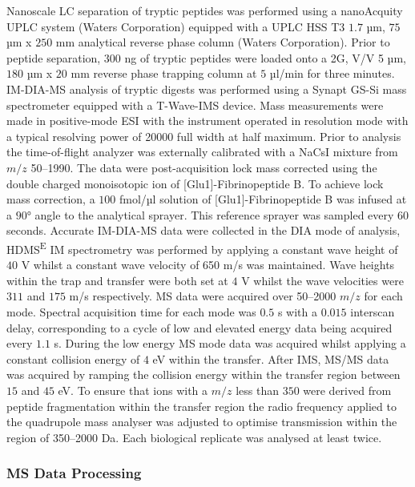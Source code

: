 Nanoscale LC separation of tryptic peptides was performed using a nanoAcquity UPLC system (Waters Corporation) equipped with a UPLC HSS T3 $1.7$ µm, $75$ µm x $250$ mm analytical reverse phase column (Waters Corporation).
Prior to peptide separation, $300$ ng of tryptic peptides were loaded onto a 2G, V/V 5 µm, $180$ µm x $20$ mm reverse phase trapping column at $5$ µl/min for three minutes.
IM-DIA-MS analysis of tryptic digests was performed using a Synapt GS-Si mass spectrometer equipped with a T-Wave-IMS device.
Mass measurements were made in positive-mode ESI with the instrument operated in resolution mode with a typical resolving power of \num{20000} full width at half maximum.
Prior to analysis the time-of-flight analyzer was externally calibrated with a NaCsI mixture from $m/z$ \numrange{50}{1990}. The data were post-acquisition lock mass corrected using the double charged monoisotopic ion of [Glu1]-Fibrinopeptide B.
To achieve lock mass correction, a $100$ fmol/µl solution of [Glu1]-Fibrinopeptide B was infused at a $90$° angle to the analytical sprayer. This reference sprayer was sampled every $60$ seconds.
Accurate IM-DIA-MS data were collected in the DIA mode of analysis, HDMS\textsuperscript{E} IM spectrometry was performed by applying a constant wave height of $40$ V whilst a constant wave velocity of 650 m/s was maintained.
Wave heights within the trap and transfer were both set at $4$ V whilst the wave velocities were $311$ and $175$ m/s respectively.
MS data were acquired over \numrange{50}{2000} $m/z$ for each mode.
Spectral acquisition time for each mode was $0.5$ s with a $0.015$ interscan delay, corresponding to a cycle of low and elevated energy data being acquired every $1.1$ s.
During the low energy MS mode data was acquired whilst applying a constant collision energy of $4$ eV within the transfer.
After IMS, MS/MS data was acquired by ramping the collision energy within the transfer region between $15$ and $45$ eV.
To ensure that ions with a $m/z$ less than $350$ were derived from peptide fragmentation within the transfer region the radio frequency applied to the quadrupole mass analyser was adjusted to optimise transmission within the region of \numrange{350}{2000} Da.
Each biological replicate was analysed at least twice.

\subsubsection{MS Data Processing}

